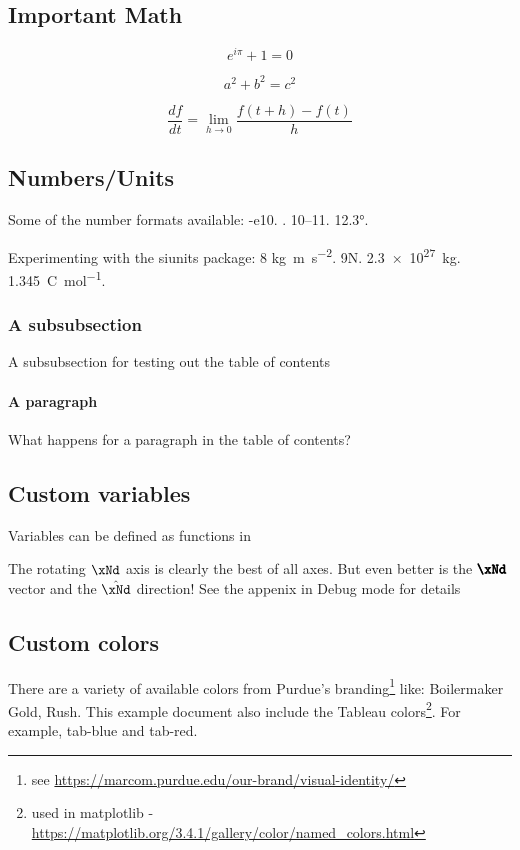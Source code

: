 \subsection{Important Math}

\begin{equation}
    e^{i\pi}+1=0
    \label{eq:euler}
\end{equation}

\begin{equation}
    a^2+b^2=c^2
    \label{eq:pythagorean}
\end{equation}

\begin{equation}
    \frac{df}{dt} = \lim_{h\rightarrow 0} \frac{f(t+h)-f(t)}{h}
    \label{eq:calculus}
\end{equation}

\subsection{Numbers/Units}
Some of the number formats available: \num{-e10}. . \numrange{10}{11}. \ang{12.3}.

Experimenting with the siunits package: 8 \unit{\kilo\gram\metre\per\square\second}. 9\unit{\newton}. \qty{2.3e27}{\kilogram}. \qty[per-mode = fraction]{1,345}{\coulomb\per\mole}.

\subsubsection{A subsubsection} 
A subsubsection for testing out the table of contents

\paragraph{A paragraph}
What happens for a paragraph in the table of contents?

\subsection{Custom variables}

Variables can be defined as functions in 

The rotating $\xNd$ axis is clearly the best of all axes. But even better is the $\vectorFmt{\xNd}$ vector and the $\unitVecFmt{\xNd}$ direction! See the appenix in Debug mode for details

\subsection{Custom colors}
There are a variety of available colors from Purdue's branding\footnote{see \href{https://marcom.purdue.edu/our-brand/visual-identity/}{https://marcom.purdue.edu/our-brand/visual-identity/}} like: {\color{purdue-boilermaker-gold} Boilermaker Gold}, {\color{purdue-rush} Rush}. This example document also include the Tableau colors\footnote{used in matplotlib - \href{https://matplotlib.org/3.4.1/gallery/color/named_colors.html}{https://matplotlib.org/3.4.1/gallery/color/named\_colors.html}}. For example, {\color{tab-blue} tab-blue} and {\color{tab-red} tab-red}.